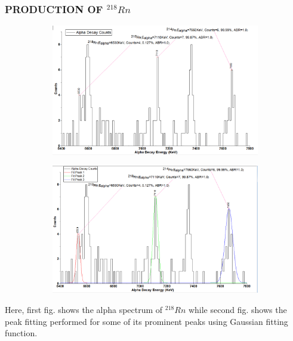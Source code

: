 \documentclass[12pt]{article}
\begin{document}
\subsubsection{PRODUCTION OF $^{218}Rn$}
\begin{figure}[h]
\centering
 \begin{subfigure}
\centering
\includegraphics[scale=0.5]{Rn218.png}
\end{subfigure}
\hfill
\begin{subfigure}
\centering
\includegraphics[scale=0.5]{Rn218(Peak Fitting).png}
\end{subfigure}
\label{First fig shows the alpha spectrum of Rn 218 and second fig shows the peak fitting for its prominent peaks.}
\end{figure}
Here, first fig. shows the alpha spectrum of $^{218}Rn$ while second fig. shows the peak fitting performed for some of its prominent peaks using Gaussian fitting function.
\clearpage
\end{document}
